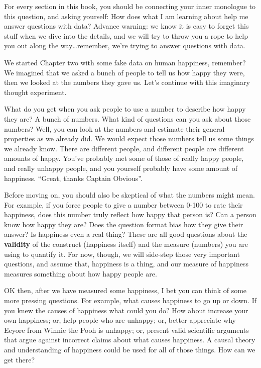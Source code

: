 \documentclass[]{book}
\begin{document}
For every section in this book, you should be connecting your inner monologue to this question, and asking yourself: How does what I am learning about help me answer questions with data? Advance warning: we know it is easy to forget this stuff when we dive into the details, and we will try to throw you a rope to help you out along the way\ldots{}remember, we're trying to answer questions with data.

We started Chapter two with some fake data on human happiness, remember? We imagined that we asked a bunch of people to tell us how happy they were, then we looked at the numbers they gave us. Let's continue with this imaginary thought experiment.

What do you get when you ask people to use a number to describe how happy they are? A bunch of numbers. What kind of questions can you ask about those numbers? Well, you can look at the numbers and estimate their general properties as we already did. We would expect those numbers tell us some things we already know. There are different people, and different people are different amounts of happy. You've probably met some of those of really happy people, and really unhappy people, and you yourself probably have some amount of happiness. ``Great, thanks Captain Obvious''.

Before moving on, you should also be skeptical of what the numbers might mean. For example, if you force people to give a number between 0-100 to rate their happiness, does this number truly reflect how happy that person is? Can a person know how happy they are? Does the question format bias how they give their answer? Is happiness even a real thing? These are all good questions about the \textbf{validity} of the construct (happiness itself) and the measure (numbers) you are using to quantify it. For now, though, we will side-step those very important questions, and assume that, happiness is a thing, and our measure of happiness measures something about how happy people are.

OK then, after we have measured some happiness, I bet you can think of some more pressing questions. For example, what causes happiness to go up or down. If you knew the causes of happiness what could you do? How about increase your own happiness; or, help people who are unhappy; or, better appreciate why Eeyore from Winnie the Pooh is unhappy; or, present valid scientific arguments that argue against incorrect claims about what causes happiness. A causal theory and understanding of happiness could be used for all of those things. How can we get there?
\end{document}
